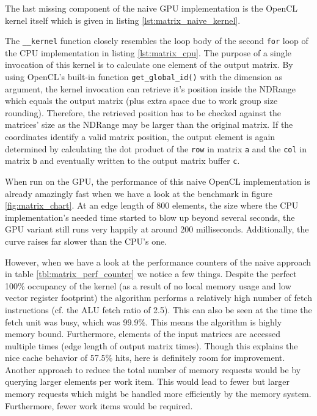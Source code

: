 The last missing component of the naive GPU implementation is the OpenCL kernel itself which is given in listing \ref{lst:matrix_naive_kernel}.



The \lstinline!__kernel! function closely resembles the loop body of the second \lstinline!for! loop of the CPU implementation in listing \ref{lst:matrix_cpu}. The purpose of a single invocation of this kernel is to calculate one element of the output matrix. By using OpenCL's built-in function \lstinline!get_global_id()! with the dimension as argument, the kernel invocation can retrieve it's position inside the NDRange which equals the output matrix (plus extra space due to work group size rounding). Therefore, the retrieved position has to be checked against the matrices' size as the NDRange may be larger than the original matrix. If the coordinates identify a valid matrix position, the output element is again determined by calculating the dot product of the \lstinline!row! in matrix \lstinline!a! and the \lstinline!col! in matrix \lstinline!b! and eventually written to the output matrix buffer \lstinline!c!.

When run on the GPU, the performance of this naive OpenCL implementation is already amazingly fast when we have a look at the benchmark in figure \ref{fig:matrix_chart}. At an edge length of 800 elements, the size where the CPU implementation's needed time started to blow up beyond several seconds, the GPU variant still runs very happily at around 200 milliseconds. Additionally, the curve raises far slower than the CPU's one.

However, when we have a look at the performance counters of the naive approach in table \ref{tbl:matrix_perf_counter} we notice a few things. Despite the perfect 100\% occupancy of the kernel (as a result of no local memory usage and low vector register footprint) the algorithm performs a relatively high number of fetch instructions (cf. the ALU fetch ratio of 2.5). This can also be seen at the time the fetch unit was busy, which was 99.9\%. This means the algorithm is highly memory bound. Furthermore, elements of the input matrices are accessed multiple times (edge length of output matrix times). Though this explains the nice cache behavior of 57.5\% hits, here is definitely room for improvement.
Another approach to reduce the total number of memory requests would be by querying larger elements per work item. This would lead to fewer but larger memory requests which might be handled more efficiently by the memory system. Furthermore, fewer work items would be required.

